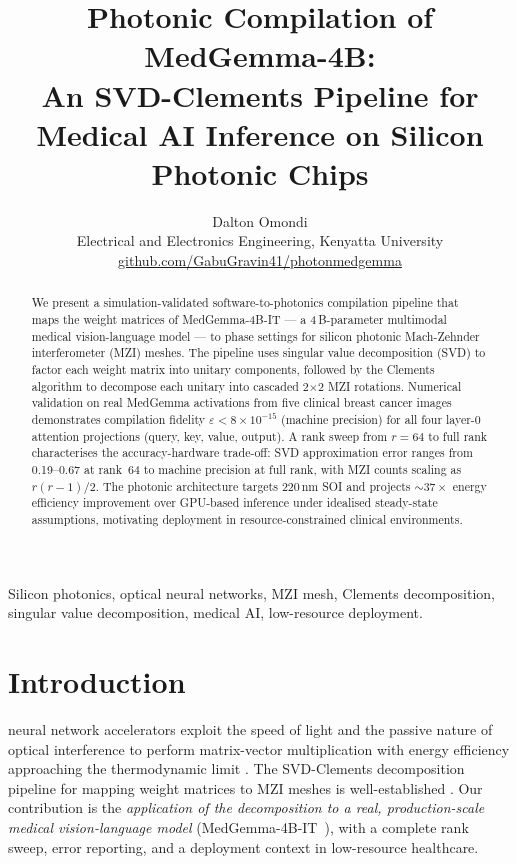 \documentclass[journal]{IEEEtran}
\title{Photonic Compilation of MedGemma-4B:\\
       An SVD-Clements Pipeline for\\
       Medical AI Inference on Silicon Photonic Chips}
\author{
  Dalton Omondi\\[2pt]
  \small Electrical and Electronics Engineering, Kenyatta University\\[2pt]
  \small \href{https://github.com/GabuGravin41/photonmedgemma}{github.com/GabuGravin41/photonmedgemma}
}
\begin{document}
\maketitle

\begin{abstract}
We present a simulation-validated software-to-photonics compilation pipeline
that maps the weight matrices of MedGemma-4B-IT --- a 4\,B-parameter multimodal
medical vision-language model --- to phase settings for silicon photonic
Mach-Zehnder interferometer (MZI) meshes.
The pipeline uses singular value decomposition (SVD) to factor each weight
matrix into unitary components, followed by the Clements algorithm to
decompose each unitary into cascaded 2$\times$2 MZI rotations.
Numerical validation on real MedGemma activations from five clinical breast
cancer images demonstrates compilation fidelity $\varepsilon < 8\times10^{-15}$
(machine precision) for all four layer-0 attention projections
(query, key, value, output).
A rank sweep from $r=64$ to full rank characterises the accuracy-hardware
trade-off: SVD approximation error ranges from 0.19--0.67 at rank~64 to
machine precision at full rank, with MZI counts scaling as $r(r-1)/2$.
The photonic architecture targets 220\,nm SOI and projects $\sim37\times$
energy efficiency improvement over GPU-based inference under idealised
steady-state assumptions, motivating deployment in resource-constrained
clinical environments.
\end{abstract}

\begin{IEEEkeywords}
Silicon photonics, optical neural networks, MZI mesh, Clements decomposition,
singular value decomposition, medical AI, low-resource deployment.
\end{IEEEkeywords}

\section{Introduction}
\label{sec:intro}

 neural network accelerators exploit the speed of
light and the passive nature of optical interference to perform matrix-vector
multiplication with energy efficiency approaching the thermodynamic limit
\cite{shen2017}.
The SVD-Clements decomposition pipeline for mapping weight matrices to MZI
meshes is well-established
\cite{reck1994, clements2016, shen2017, bandyopadhyay2022, pai2023}.
Our contribution is the
\emph{application of the decomposition to a real, production-scale medical vision-language model}
(MedGemma-4B-IT~\cite{medgemma2025}), with a complete rank sweep, error reporting, and a deployment context in low-resource healthcare.
\end{document}
